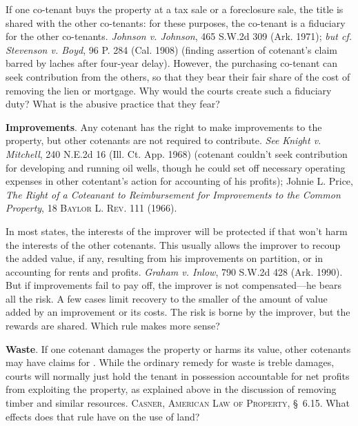If one co-tenant buys the property at a tax sale or a foreclosure sale, the
title is shared with the other co-tenants: for these purposes, the co-tenant is
a fiduciary for the other co-tenants. \emph{Johnson v. Johnson}, 465 S.W.2d 309
(Ark. 1971); \textit{but cf.} \emph{Stevenson v. Boyd}, 96 P. 284 (Cal. 1908)
(finding assertion of cotenant's claim barred by laches after four-year delay).
However, the purchasing co-tenant can seek contribution from the others, so that
they bear their fair share of the cost of removing the lien or mortgage. Why
would the courts create such a fiduciary duty? What is the abusive practice that
they fear?


\item \label{martin-improvements}\textbf{Improvements}. Any cotenant has the
right
to make improvements to the property, but other cotenants are not required to
contribute. \emph{See} \emph{Knight v. Mitchell}, 240 N.E.2d 16 (Ill. Ct. App.
1968) (cotenant couldn't seek contribution for developing and running oil wells,
though he could set off necessary operating expenses in other cotentant's action
for accounting of his profits); Johnie L. Price, \textit{The Right of a
Coteanant to Reimbursement for Improvements to the Common Property}, 18
\textsc{Baylor L. Rev}. 111 (1966).

In most states, the interests of the improver will be protected if that won't
harm the interests of the other cotenants. This usually allows the improver to
recoup the added value, if any, resulting from his improvements on partition, or
in accounting for rents and profits. \emph{Graham v. Inlow}, 790 S.W.2d 428
(Ark. 1990). But if improvements fail to pay off, the improver is not
compensated---he bears all the risk. A few cases limit recovery to the smaller
of the amount of value added by an improvement or its costs. The risk is borne
by the improver, but the rewards are shared. Which rule makes more sense?

\item \textbf{Waste}. If one cotenant damages the property or harms
its value, other cotenants may have claims for . While the ordinary
remedy for waste is treble damages, courts will normally just hold the tenant
in possession accountable for net profits from exploiting the property, as
explained above in the discussion of removing timber and similar resources.
\textsc{Casner, American Law of Property}, \S~6.15. What effects does that
rule have on the use of land?


